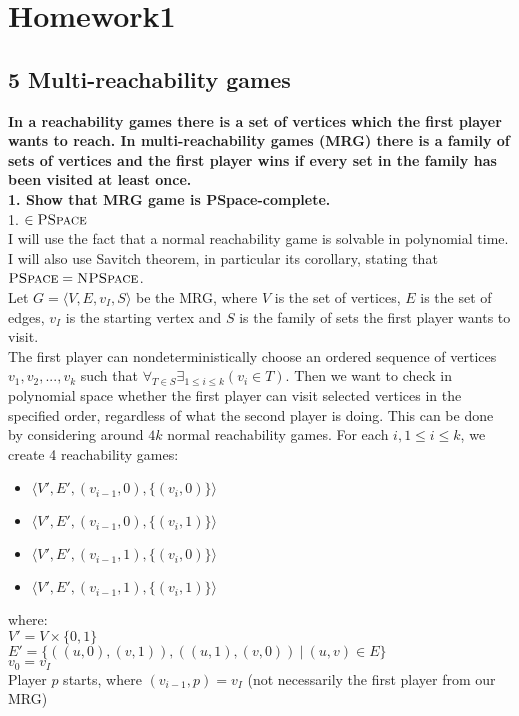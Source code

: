 \section{Homework1}
\subsection*{5 Multi-reachability games}
\textbf{In a reachability games there is a set of vertices which the first player
wants to reach. In multi-reachability games (MRG) there is a family of
sets of vertices and the first player wins if every set in the family has been
visited at least once.\\
1. Show that MRG game is PSpace-complete.}\\
1. \underline{$\in \textsc{PSpace}$}\\
I will use the fact that a normal reachability game is solvable in polynomial time.
I will also use Savitch theorem, in particular its corollary, stating that
$\textsc{PSpace} = \textsc{NPSpace}$.\\
Let $G = \langle V, E, v_I, S \rangle$ be the MRG, where $V$ is the set of vertices,
$E$ is the set of edges, $v_I$ is the starting vertex and $S$ is the family of sets
the first player wants to visit.\\
The first player can nondeterministically choose an ordered sequence of vertices
$v_1, v_2, ..., v_k$ such that $\forall_{T \in S} \exists_{1 \leq i \leq k} (v_i \in T)$.
Then we want to check in polynomial space whether the first player can visit selected
vertices in the specified order, regardless of what the second player is doing.
This can be done by considering around $4k$ normal reachability games. For each $i, 1 \leq i \leq k$,
we create 4 reachability games:
\begin{itemize}
      \item $\langle V', E', (v_{i-1}, 0), \{ (v_i, 0) \} \rangle$
      \item $\langle V', E', (v_{i-1}, 0), \{ (v_i, 1) \} \rangle$
      \item $\langle V', E', (v_{i-1}, 1), \{ (v_i, 0) \} \rangle$
      \item $\langle V', E', (v_{i-1}, 1), \{ (v_i, 1) \} \rangle$
\end{itemize}
where:\\
$V' = V \times \{0,1\}$\\
$E' = \{ ((u,0), (v,1)), ((u,1),(v,0)) \ |\ (u, v) \in E \}$\\
$v_0 = v_I$\\
Player $p$ starts, where $(v_{i-1}, p) = v_I$ (not necessarily the first player from our MRG)\\

